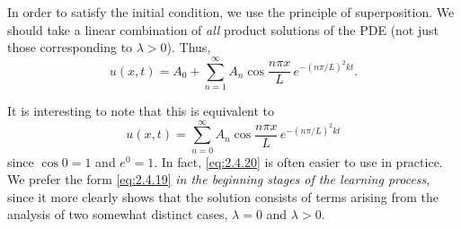 In order to satisfy the initial condition, we use the principle of superposition. We should take a linear combination of \emph{all} product solutions of the PDE (not just those corresponding to $\lambda > 0$). Thus,
\begin{equation}
\label{eq:2.4.19}
u(x,t) = A_0 + \sum_{n=1}^{\infty} A_n\cos\frac{n\pi x}{L}\,e^{-(n\pi/L)^2 kt}.
\end{equation}

It is interesting to note that this is equivalent to
\begin{equation}
\label{eq:2.4.20}
u(x,t) = \sum_{n=0}^{\infty} A_n\cos\frac{n\pi x}{L}\,e^{-(n\pi/L)^2 kt}
\end{equation}
since $\cos 0 = 1$ and $e^0 = 1$. In fact, \eqref{eq:2.4.20} is often easier to use in practice. We prefer the form \eqref{eq:2.4.19} \emph{in the beginning stages of the learning process}, since it more clearly shows that the solution consists of terms arising from the analysis of two somewhat distinct cases, $\lambda = 0$ and $\lambda > 0$.


